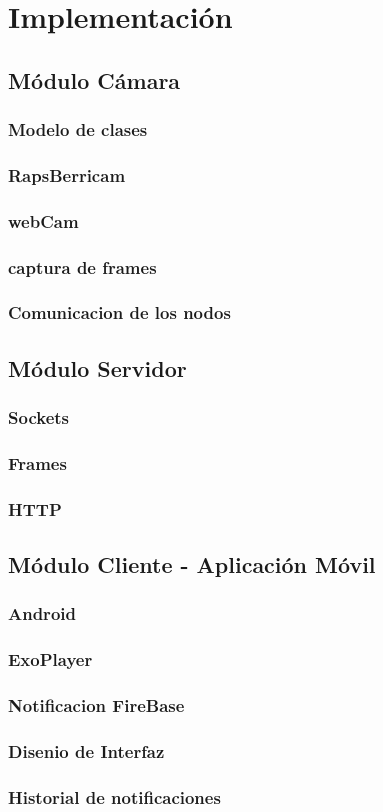 \chapter{Implementación}

\section{Módulo Cámara}
\subsection{Modelo de clases}
\subsection{RapsBerricam}
\subsection{webCam}
\subsection{captura de frames}
\subsection{Comunicacion de los nodos}

\section{Módulo Servidor}
\subsection{Sockets}
\subsection{Frames}
\subsection{HTTP}

\section{Módulo Cliente - Aplicación Móvil}
\subsection{Android}
\subsection{ExoPlayer}
\subsection{Notificacion FireBase}
\subsection{Disenio de Interfaz}
\subsection{Historial de notificaciones}

